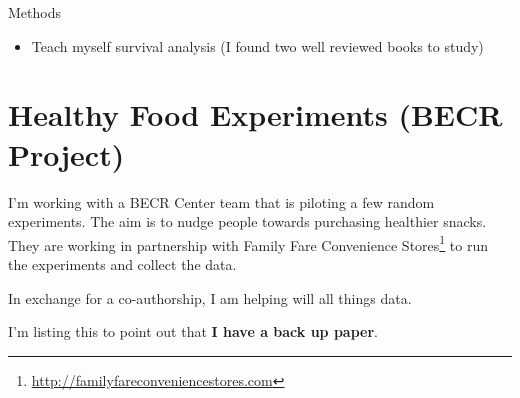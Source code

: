 \documentclass[12pt,letterpaperpaper,]{book}
\providecommand{\tightlist}{%
  \setlength{\itemsep}{0pt}\setlength{\parskip}{0pt}}
\renewcommand{\href}[2]{#2\footnote{\url{#1}}}
\begin{document}
Methods

\begin{itemize}
\tightlist
\item
  Teach myself survival analysis (I found two well reviewed books to
  study)
\end{itemize}

\chapter{Healthy Food Experiments (BECR
Project)}\label{healthy-food-experiments-becr-project}

I'm working with a BECR Center team that is piloting a few random
experiments. The aim is to nudge people towards purchasing healthier
snacks. They are working in partnership with
\href{http://familyfareconveniencestores.com}{Family Fare Convenience
Stores} to run the experiments and collect the data.

In exchange for a co-authorship, I am helping will all things data.

I'm listing this to point out that \textbf{I have a back up paper}.



\backmatter
\printindex
\end{document}
